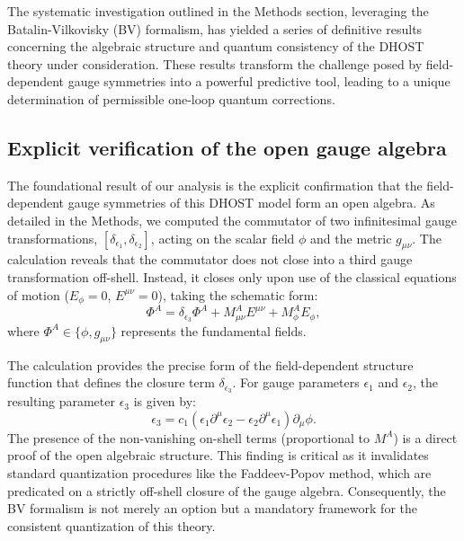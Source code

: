 \documentclass[twocolumn]{aastex631}
\begin{document}
The systematic investigation outlined in the Methods section, leveraging the Batalin-Vilkovisky (BV) formalism, has yielded a series of definitive results concerning the algebraic structure and quantum consistency of the DHOST theory under consideration. These results transform the challenge posed by field-dependent gauge symmetries into a powerful predictive tool, leading to a unique determination of permissible one-loop quantum corrections.

\subsection{Explicit verification of the open gauge algebra}
The foundational result of our analysis is the explicit confirmation that the field-dependent gauge symmetries of this DHOST model form an open algebra. As detailed in the Methods, we computed the commutator of two infinitesimal gauge transformations, $[\delta_{\epsilon_1}, \delta_{\epsilon_2}]$, acting on the scalar field $\phi$ and the metric $g_{\mu\nu}$. The calculation reveals that the commutator does not close into a third gauge transformation off-shell. Instead, it closes only upon use of the classical equations of motion ($E_\phi=0$, $E^{\mu\nu}=0$), taking the schematic form:
\begin{equation}
    [\delta_{\epsilon_1}, \delta_{\epsilon_2}] \Phi^A = \delta_{\epsilon_3} \Phi^A + M^A_{\mu\nu} E^{\mu\nu} + M^A_{\phi} E_{\phi},
\end{equation}
where $\Phi^A \in \{\phi, g_{\mu\nu}\}$ represents the fundamental fields.

The calculation provides the precise form of the field-dependent structure function that defines the closure term $\delta_{\epsilon_3}$. For gauge parameters $\epsilon_1$ and $\epsilon_2$, the resulting parameter $\epsilon_3$ is given by:
\begin{equation}
    \epsilon_3 = c_1 (\epsilon_1 \partial^\mu \epsilon_2 - \epsilon_2 \partial^\mu \epsilon_1) \partial_\mu \phi.
    \label{eq:structure_function}
\end{equation}
The presence of the non-vanishing on-shell terms (proportional to $M^A$) is a direct proof of the open algebraic structure. This finding is critical as it invalidates standard quantization procedures like the Faddeev-Popov method, which are predicated on a strictly off-shell closure of the gauge algebra. Consequently, the BV formalism is not merely an option but a mandatory framework for the consistent quantization of this theory.
\end{document}

